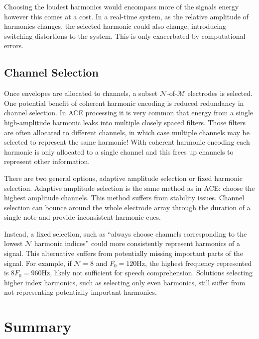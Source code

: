 \documentclass [11pt, proquest,oneside] {ganter_thesis}[2015/03/03]
\begin{document}
Choosing the loudest harmonics would encompass more of the signals energy however this comes at a cost.  In a real-time system, as the relative amplitude of harmonics changes, the selected harmonic could also change, introducing switching distortions to the system.  This is only exacerbated by computational errors.


\subsection{Channel Selection}

Once envelopes are allocated to channels, a subset $\mathcal{N}$-of-$\mathcal{M}$ electrodes is selected.  One potential benefit of coherent harmonic encoding is reduced redundancy in channel selection.  In ACE processing it is very common that energy from a single high-amplitude harmonic leaks into multiple closely spaced filters.  Those filters are often allocated to different channels, in which case multiple channels may be selected to represent the same harmonic!  With coherent harmonic encoding each harmonic is only allocated to a single channel and this frees up channels to represent other information.

There are two general options, adaptive amplitude selection or fixed harmonic selection.  Adaptive amplitude selection is the same method as in ACE: choose the highest amplitude channels.  This method suffers from stability issues.  Channel selection can bounce around the whole electrode array through the duration of a single note and provide inconsistent harmonic cues.

Instead, a fixed selection, such as ``always choose channels corresponding to the lowest $\mathcal{N}$ harmonic indices'' could more consistently represent harmonics of a signal.  This alternative suffers from potentially missing important parts of the signal.  For example, if $\mathcal{N} = 8$ and $F_0 = 120$Hz, the highest frequency represented is $8F_0 = 960$Hz, likely not sufficient for speech comprehension.  Solutions selecting higher index harmonics, such as selecting only even harmonics, still suffer from not representing potentially important harmonics.

\section{Summary}
\end{document}
